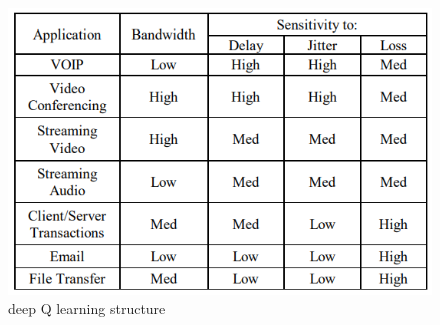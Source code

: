 \documentclass[conference]{IEEEtran}
\begin{document}
\begin{enumerate}
\begin{figure}
    \includegraphics[width=\linewidth]{qos}
  \caption{deep Q learning structure \cite{qos}}
  \label{fig:qos}
\end{figure}
\end{enumerate}



\end{document}
